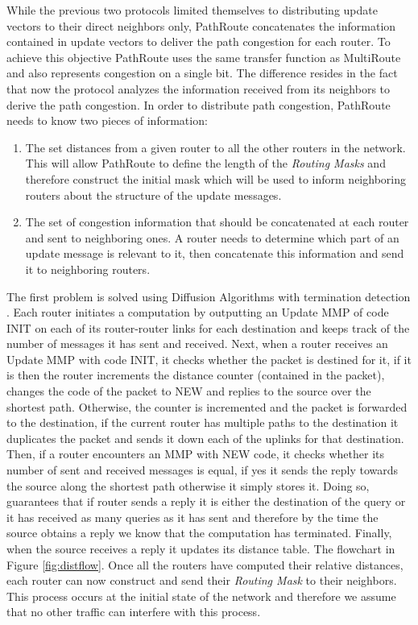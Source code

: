 While the previous two protocols limited themselves to distributing update
vectors to their direct neighbors only, PathRoute concatenates the information
contained in update vectors to deliver the path congestion for each router. To
achieve this objective PathRoute uses the same transfer function as MultiRoute
and also represents congestion on a single bit. The difference resides in the
fact that now the protocol analyzes the information received from its neighbors
to derive the path congestion. In order to distribute path congestion, 
PathRoute needs to know two pieces of information:

\begin{enumerate}
\item The set distances from a given router to all the other routers in the network. This will allow PathRoute to define the length of the \textit{Routing Masks} and therefore construct the initial mask which will be used to inform neighboring routers about the structure of the update messages.
\item The set of congestion information that should be concatenated at each
router and sent to neighboring ones.  A router needs to determine which part of
an update message is relevant to it, then concatenate this information and send
it to neighboring routers.
\end{enumerate} 

The first problem is solved using Diffusion Algorithms with termination
detection \cite{DijkstraTerm}. Each router initiates a computation by outputting
an Update MMP of code INIT on each of its router-router links for each destination and
keeps track of the number of messages it has sent and received. Next, when a
router receives an Update MMP with code INIT, it checks whether the packet is
destined for it, if it is then the router increments the distance counter
(contained in the packet), changes the code of the packet to NEW and replies to
the source over the shortest path. Otherwise, the counter is incremented and the packet is forwarded to the
destination, if the current router has multiple paths to the destination it
duplicates the packet and sends it down each of the uplinks for that
destination. Then, if a router encounters an MMP with NEW code, it checks
whether its number of sent and received messages is equal, if yes it sends the
reply towards the source along the shortest path otherwise it simply stores it.
Doing so, guarantees that if router sends a reply it is either the destination
of the query or it has received as many queries as it has sent and therefore by
the time the source obtains a reply we know that the computation has terminated.
Finally, when the source receives a reply it updates its distance table. The
flowchart in Figure \ref{fig:distflow}. Once all the routers have computed their
relative distances, each router can now construct and send their \textit{Routing
Mask} to their neighbors. This process occurs at the initial state of the network and therefore we assume that no other traffic can interfere with this process. 

